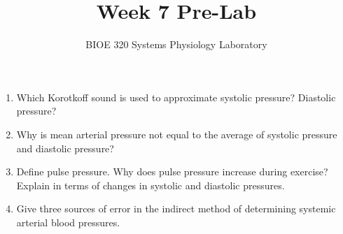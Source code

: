 \documentclass{article}
\title{Week 7 Pre-Lab}
\author{BIOE 320 Systems Physiology Laboratory}
\date{}
\begin{document}
\maketitle
\large

\begin{enumerate}
	\item Which Korotkoff sound is used to approximate systolic pressure? Diastolic pressure?
	\item Why is mean arterial pressure not equal to the average of systolic pressure and diastolic pressure?
	\item Define pulse pressure. Why does pulse pressure increase during exercise? Explain in terms of changes in systolic and diastolic pressures.
	\item Give three sources of error in the indirect method of determining systemic arterial blood pressures.
\end{enumerate}
\end{document}
